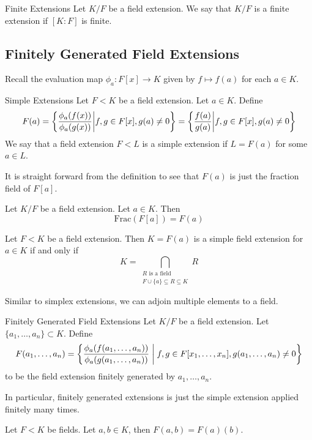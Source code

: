\documentclass[a4paper]{article}
\begin{document}
\begin{defn}{Finite Extensions}{} Let $K/F$ be a field extension. We say that $K/F$ is a finite extension if $[K:F]$ is finite. 
\end{defn}

\subsection{Finitely Generated Field Extensions}
Recall the evaluation map $\phi_a:F[x]\to K$ given by $f\mapsto f(a)$ for each $a\in K$. 

\begin{defn}{Simple Extensions}{} Let $F<K$ be a field extension. Let $a\in K$. Define 
$$F(a)=\left\{\frac{\phi_a(f(x))}{\phi_a(g(x))}\bigg{|}f,g\in F[x],g(a)\neq 0\right\}=\left\{\frac{f(a)}{g(a)}\bigg{|}f,g\in F[x],g(a)\neq 0\right\}$$
We say that a field extension $F<L$ is a simple extension if $L=F(a)$ for some $a\in L$. 
\end{defn}

It is straight forward from the definition to see that $F(a)$ is just the fraction field of $F[a]$. 

\begin{lmm}{}{} Let $K/F$ be a field extension. Let $a\in K$. Then $$\text{Frac}(F[a])=F(a)$$
\end{lmm}

\begin{prp}{}{} Let $F<K$ be a field extension. Then $K=F(a)$ is a simple field extension for $a\in K$ if and only if $$K=\bigcap_{\substack{R\text{ is a field}\\F\cup\{a\}\subseteq R\subseteq K}}R$$
\end{prp}

Similar to simplex extensions, we can adjoin multiple elements to a field. 

\begin{defn}{Finitely Generated Field Extensions}{} Let $K/F$ be a field extension. Let $\{a_1,\dots,a_n\}\subset K$. Define $$F(a_1,\dots,a_n)=\left\{\frac{\phi_a(f(a_1,\dots,a_n))}{\phi_a(g(a_1,\dots,a_n))}\;\bigg{|}\;f,g\in F[x_1,\dots,x_n],g(a_1,\dots,a_n)\neq 0\right\}$$ to be the field extension finitely generated by $a_1,\dots,a_n$. 
\end{defn}

In particular, finitely generated extensions is just the simple extension applied finitely many times. 

\begin{lmm}{}{} Let $F<K$ be fields. Let $a,b\in K$, then $F(a,b)=F(a)(b)$. 
\end{lmm}
\end{document}
